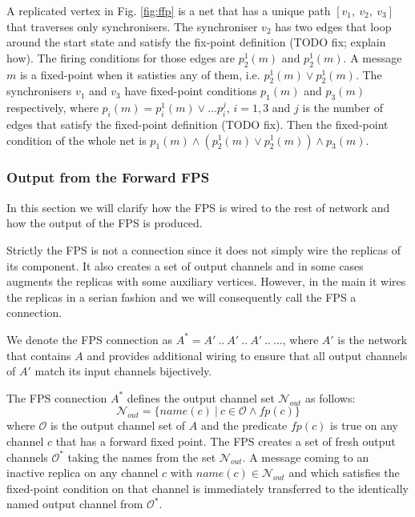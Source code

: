 A replicated vertex in Fig. \ref{fig:ffp} is a net that has a unique path $[v_1, \: v_2, \: v_3]$ that traverses only synchronisers. The synchroniser $v_2$ has two edges that loop around the start state and satisfy the fix-point definition (TODO fix; explain how). The firing conditions for those edges are $p^{1}_2(m)$ and $p^{1}_2(m)$. A message $m$ is a fixed-point when it satisties any of them, i.e. $p^{1}_2(m) \lor p^{1}_2(m)$. The synchronisers $v_1$ and $v_3$ have fixed-point conditions $p_1(m)$ and $p_3(m)$ respectively, where $p_i(m) = p^{1}_i(m) \lor \dots p^{j}_i$, $i=1,3$ and $j$ is the number of edges that satisfy the fixed-point definition (TODO fix). Then the fixed-point condition of the whole net is $p_1(m) \land (p^{1}_2(m) \lor p^{1}_2(m)) \land p_3(m)$.






    \subsubsection{Output from the Forward FPS}
In this section we will clarify how the FPS is wired to the rest of network and how the output of the FPS is produced.

Strictly the FPS is not a connection since it does not simply wire the replicas of its component. It also creates a set of output channels and in some cases augments the replicas with some auxiliary vertices. However, in the main it wires the replicas in a serian fashion and we will consequently call the FPS a connection.

We denote the FPS connection as $A^{*} = A' \: .. \: A' \: .. \: A' \: .. \: \dots$, where $A'$ is the network that contains $A$ and provides additional wiring to ensure that all output channels of $A'$ match its input channels bijectively.

The FPS connection $A^{*}$ defines the output channel set $\mathcal{N}_{out}$ as follows:
\begin{equation}
\mathcal{N}_{out} = \{ name(c) \: | \: c \in \mathcal{O} \land fp(c) \}\nonumber
\end{equation}
where $\mathcal{O}$ is the output channel set of $A$ and the predicate $fp(c)$ is true on any channel $c$ that has a forward fixed point. The FPS creates a set of fresh output channels $\mathcal{O}^{*}$ taking the names from the set $\mathcal{N}_{out}$. A message coming to an inactive replica on any channel $c$ with $name(c) \in \mathcal{N}_{out}$ and which satisfies the fixed-point condition on that channel is immediately transferred to the identically named output channel from $\mathcal{O}^{*}$.

